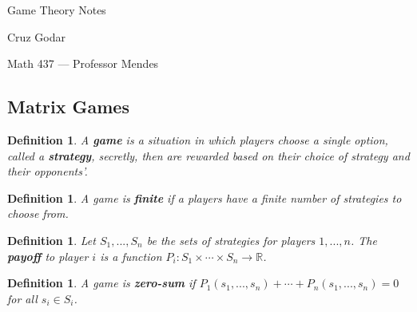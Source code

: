 \documentclass{article}
\theoremstyle{colontheorem}
\newtheorem{definition}[theorem]{Definition}
\newenvironment{Def}
{
	\begin{mdframed}[backgroundcolor=DefGreen!10]
	\begin{definition}
}
{
	\end{definition}
	\end{mdframed}
	
	\vspace{.15in}
}
\begin{document}
\vspace*{.5in}

\begin{center}
	\Huge Game Theory Notes\\
	
	\vspace{.25in}
	
	\Large Cruz Godar\\
	
	\vspace{.25in}
	
	\normalsize Math 437 --- Professor Mendes
\end{center}

\vspace{.5in}





\begin{center}
	\section{Matrix Games}
	\vspace{.1in}
\end{center}



\begin{Def}
	
	A \textbf{game} is a situation in which players choose a single option, called a \textbf{strategy}, secretly, then are rewarded based on their choice of strategy and their opponents'.
	
\end{Def}



\begin{Def}
	
	A game is \textbf{finite} if a  players have a finite number of strategies to choose from.
	
\end{Def}



\begin{Def}
	
	Let $S_1, ..., S_n$ be the sets of strategies for players $1, ..., n$. The \textbf{payoff} to player $i$ is a function $P_i : S_1 \times \cdots \times S_n \longrightarrow \mathbb{R}$.
	
\end{Def}



\begin{Def}
	
	A game is \textbf{zero-sum} if $P_1(s_1, ..., s_n) + \cdots + P_n(s_1, ..., s_n) = 0$ for all $s_i \in S_i$.
	
\end{Def}
\end{document}

